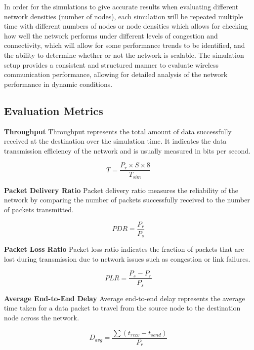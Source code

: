 \documentclass[a4paper,fleqn]{cas-dc}
\numberwithin{equation}{section}
\begin{document}
In order for the simulations to give accurate results when evaluating different network densities (number of nodes), each simulation will be repeated multiple time with different numbers of nodes or node densities which allows for checking how well the network performs under different levels of congestion and connectivity, which will allow for some performance trends to be identified, and the ability to determine whether or not the network is scalable. The simulation setup provides a consistent and structured manner to evaluate wireless communication performance, allowing for detailed analysis of the network performance in dynamic conditions.


\subsection{Evaluation Metrics}

\textbf{Throughput}  
Throughput represents the total amount of data successfully received at the destination over the simulation time. It indicates the data transmission efficiency of the network and is usually measured in bits per second.

\begin{equation}
T = \frac{P_r \times S \times 8}{T_{sim}}
\label{eq:throughput}
\end{equation}

\textbf{Packet Delivery Ratio}  
Packet delivery ratio measures the reliability of the network by comparing the number of packets successfully received to the number of packets transmitted.

\begin{equation}
PDR = \frac{P_r}{P_s}
\label{eq:pdr}
\end{equation}

\textbf{Packet Loss Ratio}  
Packet loss ratio indicates the fraction of packets that are lost during transmission due to network issues such as congestion or link failures.

\begin{equation}
PLR = \frac{P_s - P_r}{P_s}
\label{eq:plr}
\end{equation}

\textbf{Average End-to-End Delay}  
Average end-to-end delay represents the average time taken for a data packet to travel from the source node to the destination node across the network.

\begin{equation}
D_{avg} = \frac{\sum (t_{recv} - t_{send})}{P_r}
\label{eq:delay}
\end{equation}
\end{document}
